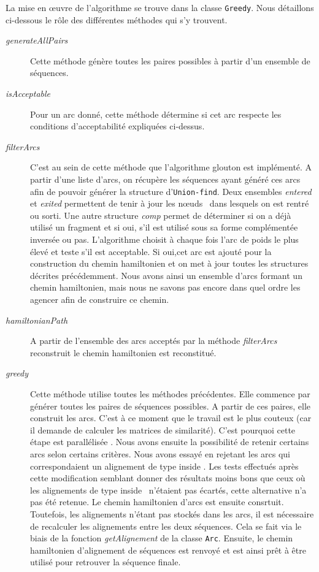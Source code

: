 La mise en \oe{}uvre de l'algorithme se trouve dans la classe \verb|Greedy|. Nous détaillons ci-dessous le rôle des différentes méthodes qui s'y trouvent.

\begin{description}
	\item[\emph{generateAllPairs}] Cette méthode génère toutes les paires possibles à partir d'un ensemble de séquences.
	\item[\emph{isAcceptable}] Pour un arc donné, cette méthode détermine si cet arc respecte les conditions d'acceptabilité expliquées ci-dessus. 
	\item[\emph{filterArcs}] C'est au sein de cette méthode que l'algorithme glouton est implémenté. A partir d'une liste d'arcs, on récupère les séquences ayant généré ces arcs afin de pouvoir générer la structure d'\verb|Union-find|. Deux ensembles \emph{entered} et \emph{exited} permettent de tenir à jour les \og n\oe{}uds \fg~dans lesquels on est rentré ou sorti. Une autre structure \emph{comp} permet de déterminer si on a déjà utilisé un fragment et si oui, s'il est utilisé sous sa forme complémentée inversée ou pas. L'algorithme choisit à chaque fois l'arc de poids le plus élevé et teste s'il est acceptable. Si oui,cet arc est ajouté pour la construction du chemin hamiltonien et on met à jour toutes les structures décrites précédemment. Nous avons ainsi un ensemble d'arcs formant un chemin hamiltonien, mais nous ne savons pas encore dans quel ordre les agencer afin de construire ce chemin.
	\item[\emph{hamiltonianPath}] A partir de l'ensemble des arcs acceptés par la méthode \emph{filterArcs} reconstruit le chemin hamiltonien est reconstitué.
	\item[\emph{greedy}] Cette méthode utilise toutes les méthodes précédentes. Elle commence par générer toutes les paires de séquences possibles. A partir de ces paires, elle construit les arcs. C'est à ce moment que le travail est le plus couteux (car il demande de calculer les matrices de similarité). C'est pourquoi cette étape est parallélisée . Nous avons ensuite la possibilité de retenir certains arcs selon certains critères. Nous avons essayé en rejetant les arcs qui correspondaient un alignement de type \og inside \fg. Les tests effectués après cette modification semblant donner des résultats moins bons que ceux où les alignements de type \og inside \fg~n'étaient pas écartés, cette alternative n'a pas été retenue. Le chemin hamiltonien d'arcs est ensuite consrtuit. Toutefois, les alignements n'étant pas stockés dans les arcs, il est nécessaire de recalculer les alignements entre les deux séquences. Cela se fait via le biais de la fonction \emph{getAlignement} de la classe \verb|Arc|. 
	Ensuite, le chemin hamiltonien d'alignement de séquences est renvoyé et est ainsi prêt à être utilisé pour retrouver la séquence finale.	
\end{description}

